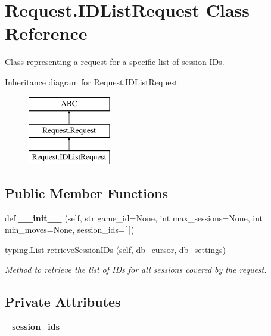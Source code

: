 \hypertarget{class_request_1_1_i_d_list_request}{}\section{Request.\+I\+D\+List\+Request Class Reference}
\label{class_request_1_1_i_d_list_request}


Class representing a request for a specific list of session I\+Ds.  


Inheritance diagram for Request.\+I\+D\+List\+Request\+:\begin{figure}[H]
\begin{center}
\leavevmode
\includegraphics[height=3.000000cm]{class_request_1_1_i_d_list_request}
\end{center}
\end{figure}
\subsection*{Public Member Functions}
\begin{DoxyCompactItemize}
\item 
\mbox{\label{class_request_1_1_i_d_list_request_a6e2d48ab545886f1e78156c80a626272}} 
def {\bfseries \+\_\+\+\_\+init\+\_\+\+\_\+} (self, str game\+\_\+id=None, int max\+\_\+sessions=None, int min\+\_\+moves=None, session\+\_\+ids=\mbox{[}$\,$\mbox{]})
\item 
typing.\+List \mbox{\hyperlink{class_request_1_1_i_d_list_request_a444c98ee565920afcd145fb9081f0eb1}{retrieve\+Session\+I\+Ds}} (self, db\+\_\+cursor, db\+\_\+settings)
\begin{DoxyCompactList}\small\item\em Method to retrieve the list of I\+Ds for all sessions covered by the request. \end{DoxyCompactList}\end{DoxyCompactItemize}
\subsection*{Private Attributes}
\begin{DoxyCompactItemize}
\item 
\mbox{\label{class_request_1_1_i_d_list_request_a2b1170a2c6d8caf224167b8fc78c9c0c}} 
{\bfseries \+\_\+session\+\_\+ids}
\end{DoxyCompactItemize}
